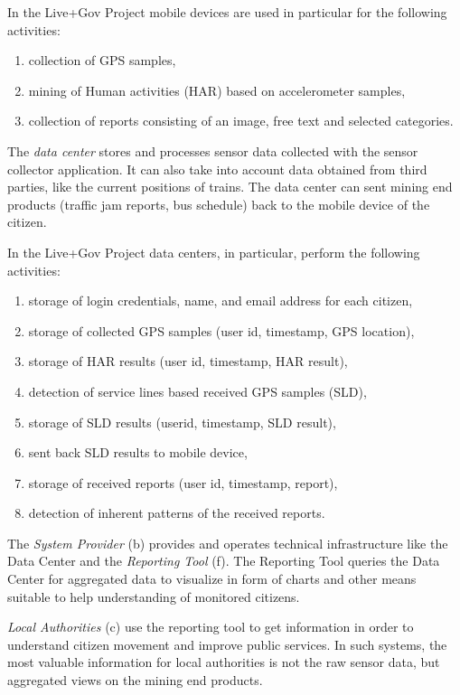 In the Live+Gov Project mobile devices are used in particular for the following activities:
\begin{enumerate}
\item collection of GPS samples,
\item mining of Human activities (HAR) based on accelerometer samples,
\item collection of reports consisting of an image, free text and selected categories.
\end{enumerate}

The \emph{data center} stores and processes sensor data collected with the sensor collector application. It can also take into account data obtained from third parties, like the current positions of trains.
The data center can sent mining end products (traffic jam reports, bus schedule) back to the mobile device of the citizen.

In the Live+Gov Project data centers, in particular, perform the following activities:
\begin{enumerate}
\item storage of login credentials, name, and email address for each citizen,
\item storage of collected GPS samples (user id, timestamp, GPS location),
\item storage of HAR results (user id, timestamp, HAR result),
\item detection of service lines based received GPS samples (SLD),
\item storage of SLD results (userid, timestamp, SLD result),
\item sent back SLD results to mobile device,
\item storage of received reports (user id, timestamp, report),
\item detection of inherent patterns of the received reports.
\end{enumerate}

The \emph{System Provider} (b) provides and operates technical infrastructure like the Data Center and the \emph{Reporting Tool} (f).
The Reporting Tool queries the Data Center for aggregated data to visualize in form of charts and other means suitable to help understanding of monitored citizens.

\textit{Local Authorities} (c) use the reporting tool to get information in order to understand citizen movement and improve public services.
In such systems, the most valuable information for local authorities is not the raw sensor data, but aggregated views on the mining end products.

